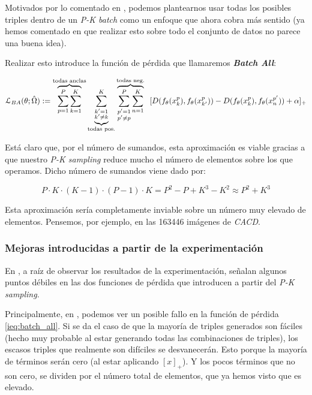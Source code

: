 Motivados por lo comentado en , podemos plantearnos usar todas los posibles triples dentro de un \textit{P-K batch} como un enfoque que ahora cobra más sentido (ya hemos comentado en  que realizar esto sobre todo el conjunto de datos no parece una buena idea).

Realizar esto introduce la función de pérdida que llamaremos \textbf{\textit{Batch All}}:

\begin{equation} \label{ieq:batch_all}
    \mathcal{L}_{BA}(\theta; \hat{\Omega}) :=
    \overbrace{\sum_{p = 1}^{P} \sum_{k = 1}^K}^\textrm{\text{todas anclas}}
    \underbrace{\sum_{\substack{k' = 1 \\ k' \neq k}}^{K}}_\textrm{\text{todas pos.}}
    \overbrace{\sum_{\substack{p' = 1 \\ p' \neq p}}^P \sum_{n = 1}^K}^\textrm{\text{todas neg.}} \ \ [
        D(f_{\theta}(x_k^p),f_{\theta}(x_{k'}^p)) - D(f_{\theta}(x_k^p),f_{\theta}(x_{n}^{p'})) + \alpha
    ]_+
\end{equation}

Está claro que, por el número de sumandos, esta aproximación es viable gracias a que nuestro \textit{P-K sampling} reduce mucho el número de elementos sobre los que operamos. Dicho número de sumandos viene dado por:

\begin{equation}
    P \cdot K \cdot (K - 1) \cdot (P - 1) \cdot K = P^2 - P + K^3 - K^2 \approx P^2 + K^3
\end{equation}

Esta aproximación sería completamente inviable sobre un número muy elevado de elementos. Pensemos, por ejemplo, en las 163446 imágenes de \textit{CACD}.

\subsubsection{Mejoras introducidas a partir de la experimentación} \label{isubsubs:mejoras_sumandos_no_nulos}

En \cite{informatica:principal}, a raíz de observar los resultados de la experimentación, señalan algunos puntos débiles en las dos funciones de pérdida que introducen a partir del \textit{P-K sampling}.

Principalmente, en , podemos ver un posible fallo en la función de pérdida \eqref{ieq:batch_all}. Si se da el caso de que la mayoría de triples generados son fáciles (hecho muy probable al estar generando todas las combinaciones de triples), los escasos triples que realmente son difíciles se desvanecerán. Esto porque la mayoría de términos serán cero (al estar aplicando $[x]_+$). Y los pocos términos que no son cero, se dividen por el número total de elementos, que ya hemos visto que es elevado.

